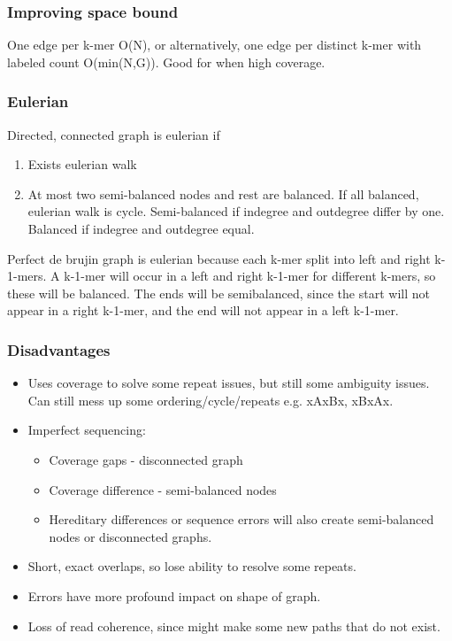 \documentclass{article}
\begin{document}
\subsubsection*{Improving space bound}
One edge per k-mer O(N), or alternatively, one edge per distinct k-mer with labeled count O(min(N,G)). Good for when high coverage.
\subsubsection*{Eulerian}
Directed, connected graph is eulerian if
\begin{enumerate}
    \item Exists eulerian walk
    \item At most two semi-balanced nodes and rest are balanced. If all balanced, eulerian walk is cycle. Semi-balanced if indegree and outdegree differ by one. Balanced if indegree and outdegree equal.
\end{enumerate}
Perfect de brujin graph is eulerian because each k-mer split into left and right k-1-mers. A k-1-mer will occur in a left and right k-1-mer for different k-mers, so these will be balanced. The ends will be semibalanced, since the start will not appear in a right k-1-mer, and the end will not appear in a left k-1-mer.

\subsubsection*{Disadvantages}
\begin{itemize}
    \item Uses coverage to solve some repeat issues, but still some ambiguity issues. Can still mess up some ordering/cycle/repeats e.g. xAxBx, xBxAx.
    \item Imperfect sequencing:
    \begin{itemize}
    \item Coverage gaps - disconnected graph
    \item Coverage difference - semi-balanced nodes
    \item Hereditary differences or sequence errors will also create semi-balanced nodes or disconnected graphs.
\end{itemize}
    \item Short, exact overlaps, so lose ability to resolve some repeats.
    \item Errors have more profound impact on shape of graph.
    \item Loss of read coherence, since might make some new paths that do not exist.
\end{itemize}
\end{document}

